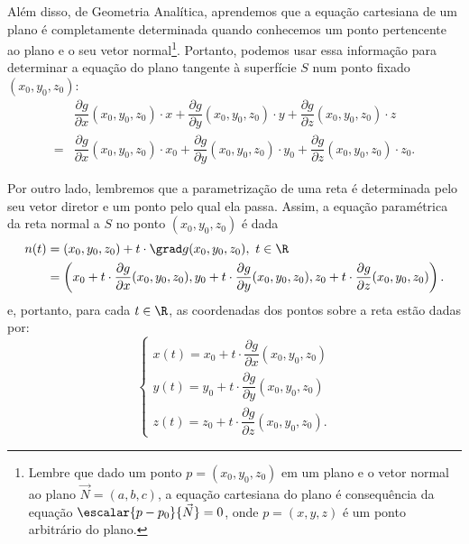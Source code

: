Além disso, de Geometria Analítica, aprendemos que a equação cartesiana de um plano é completamente determinada quando conhecemos um ponto pertencente ao plano e o seu vetor normal\footnote{Lembre que dado um ponto $p=(x_0,y_0,z_0)$ em um plano e o vetor normal ao plano $\Vec{N}=(a,b,c)$, a equação cartesiana do plano é consequência da equação $\escalar{p-p_0}{\Vec{N}}=0$, onde $p=(x,y,z)$ é um ponto arbitrário do plano.}. %
Portanto, podemos usar essa informação para determinar a equação do plano tangente à superfície \(S\) num ponto fixado \((x_0,y_0,z_0)\):
\begin{equation}\label{eq:plano_tangente_nivel}
\begin{array}{rl}
    & \dfrac{\partial g}{\partial x}(x_0,y_0,z_0)\cdot x + \dfrac{\partial g}{\partial y}(x_0,y_0,z_0)\cdot y + \dfrac{\partial g}{\partial z}(x_0,y_0,z_0) \cdot z\\[1em]
    = & \dfrac{\partial g}{\partial x}(x_0,y_0,z_0)\cdot x_0 + \dfrac{\partial g}{\partial y}(x_0,y_0,z_0)\cdot y_0 + \dfrac{\partial g}{\partial z}(x_0,y_0,z_0) \cdot z_0.  
\end{array}
\end{equation}

Por outro lado, lembremos que a parametrização de uma reta é determinada pelo seu vetor diretor e um ponto pelo qual ela passa. Assim, a equação paramétrica da reta normal a $S$ no ponto $(x_0,y_0,z_0)$ é dada 
\begin{align*}
n(t)&=(x_0,y_0,z_0)+t\cdot \grad g(x_0,y_0,z_0),~t\in\R\\
&=\left(x_0+t\cdot \dfrac{\partial g}{\partial x}(x_0,y_0,z_0),y_0 + t\cdot \dfrac{\partial g}{\partial y}(x_0,y_0,z_0),z_0+t\cdot \dfrac{\partial g}{\partial z}(x_0,y_0,z_0) \right).
\end{align*}
e, portanto, para cada $t\in\R$, as coordenadas dos pontos sobre a reta estão dadas por: 
$$
\begin{cases}
    x(t)=x_0+ t\cdot \dfrac{\partial g}{\partial x}(x_0,y_0,z_0)\\[.5em]
    y(t)=y_0+ t\cdot \dfrac{\partial g}{\partial y}(x_0,y_0,z_0)\\[.5em]
    z(t)=z_0+ t\cdot \dfrac{\partial g}{\partial z}(x_0,y_0,z_0).
\end{cases}
$$


